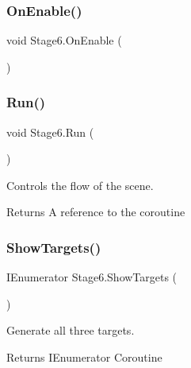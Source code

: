 \mbox{\label{class_stage6_af13c178e81408130bc3178d88892fbef}} 
\subsubsection{\texorpdfstring{On\+Enable()}{OnEnable()}}
{\footnotesize\ttfamily void Stage6.\+On\+Enable (\begin{DoxyParamCaption}{ }\end{DoxyParamCaption})\hspace{0.3cm}{\ttfamily [private]}}

\mbox{\label{class_stage6_aad2cee8912a53eeb0f784e82a3a4e484}} 
\subsubsection{\texorpdfstring{Run()}{Run()}}
{\footnotesize\ttfamily void Stage6.\+Run (\begin{DoxyParamCaption}{ }\end{DoxyParamCaption})\hspace{0.3cm}{\ttfamily [private]}}



Controls the flow of the scene. 

\begin{DoxyReturn}{Returns}
A reference to the coroutine
\end{DoxyReturn}
\mbox{\label{class_stage6_a5270b2b7fdc0958c4a9660f3528e2ebe}} 
\subsubsection{\texorpdfstring{Show\+Targets()}{ShowTargets()}}
{\footnotesize\ttfamily I\+Enumerator Stage6.\+Show\+Targets (\begin{DoxyParamCaption}{ }\end{DoxyParamCaption})\hspace{0.3cm}{\ttfamily [private]}}



Generate all three targets. 

Returns I\+Enumerator Coroutine


